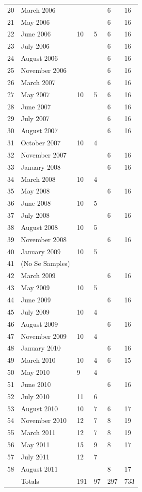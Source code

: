 {\begin{longtable}{c C{1.25in} C{.9in} C{1in} C{.9in} C{1in}}
		20 & March 2006 &  &  & 6 & 16 \\
		21 & May 2006 &  &  & 6 & 16 \\
		22 & June 2006 & 10 & 5 & 6 & 16 \\
		23 & July 2006 &  &  & 6 & 16 \\
		24 & August 2006 &  &  & 6 & 16 \\
		25 & November 2006 &  &  & 6 & 16 \\
		26 & March 2007 &  &  & 6 & 16 \\
		27 & May 2007 & 10 & 5 & 6 & 16 \\
		28 & June 2007 &  &  & 6 & 16 \\
		29 & July 2007 &  &  & 6 & 16 \\
		30 & August 2007 &  &  & 6 & 16 \\
		31 & October 2007 & 10 & 4 &  &  \\
		32 & November 2007 &  &  & 6 & 16 \\
		33 & January 2008 &  &  & 6 & 16 \\
		34 & March 2008 & 10 & 4 &  &  \\
		35 & May 2008 &  &  & 6 & 16 \\
		36 & June 2008 & 10 & 5 &  &  \\
		37 & July 2008 &  &  & 6 & 16 \\
		38 & August 2008 & 10 & 5 &  &  \\
		39 & November 2008 &  &  & 6 & 16 \\
		40 & January 2009 & 10 & 5 &  &  \\
		41 & (No Se Samples) &  &  &  &  \\
		42 & March 2009 &  &  & 6 & 16 \\
		43 & May 2009 & 10 & 5 &  &  \\
		44 & June 2009 &  &  & 6 & 16 \\
		45 & July 2009 & 10 & 4 &  &  \\
		46 & August 2009 &  &  & 6 & 16 \\
		47 & November 2009 & 10 & 4 &  &  \\
		48 & January 2010 &  &  & 6 & 16 \\
		49 & March 2010 & 10 & 4 & 6 & 15 \\
		50 & May 2010 & 9 & 4 &  &  \\
		51 & June 2010 &  &  & 6 & 16 \\
		52 & July 2010 & 11 & 6 &  &  \\
		53 & August 2010 & 10 & 7 & 6 & 17 \\
		54 & November 2010 & 12 & 7 & 8 & 19 \\
		55 & March 2011 & 12 & 7 & 8 & 19 \\
		56 & May 2011 & 15 & 9 & 8 & 17 \\
		57 & July 2011 & 12 & 7 &  &  \\
		58 & August 2011 &  &  & 8 & 17 \\\morecmidrules{}
		& Totals & 191 & 97 & 297 & 733\\
	\end{longtable}%
	\renewcommand{\arraystretch}{1.95}
}

